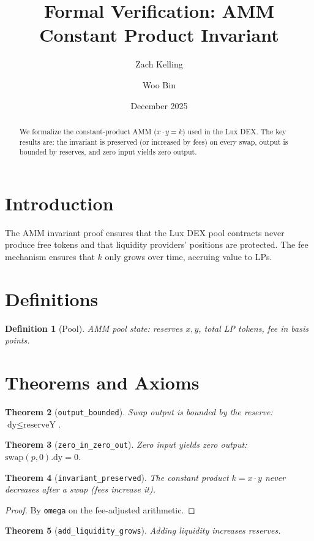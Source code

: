 \documentclass[11pt]{article}
\title{Formal Verification: AMM Constant Product Invariant}
\author{Zach Kelling \and Woo Bin}
\date{December 2025}
\newtheorem{theorem}{Theorem}
\newtheorem{definition}[theorem]{Definition}
\begin{document}
\maketitle

\begin{abstract}
We formalize the constant-product AMM ($x \cdot y = k$) used in the Lux DEX. The key results are: the invariant is preserved (or increased by fees) on every swap, output is bounded by reserves, and zero input yields zero output.
\end{abstract}

\section{Introduction}
The AMM invariant proof ensures that the Lux DEX pool contracts never produce free tokens and that liquidity providers' positions are protected. The fee mechanism ensures that $k$ only grows over time, accruing value to LPs.

\section{Definitions}
\begin{definition}[Pool]
AMM pool state: reserves $x, y$, total LP tokens, fee in basis points.
\end{definition}


\section{Theorems and Axioms}
\begin{theorem}[\texttt{output\_bounded}]
Swap output is bounded by the reserve: $\text{dy} \leq \text{reserveY}$.
\end{theorem}

\begin{theorem}[\texttt{zero\_in\_zero\_out}]
Zero input yields zero output: $\text{swap}(p, 0).\text{dy} = 0$.
\end{theorem}

\begin{theorem}[\texttt{invariant\_preserved}]
The constant product $k = x \cdot y$ never decreases after a swap (fees increase it).
\end{theorem}
\begin{proof}
By \texttt{omega} on the fee-adjusted arithmetic.
\end{proof}

\begin{theorem}[\texttt{add\_liquidity\_grows}]
Adding liquidity increases reserves.
\end{theorem}
\end{document}
